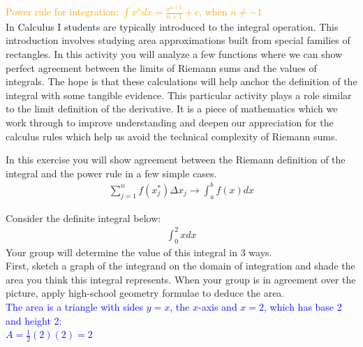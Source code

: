 \documentclass{ximera}
\begin{document}
\textcolor{orange}{Power rule for integration: $\displaystyle\int x^ndx=\frac{x^{n+1}}{n+1}+c$, when $n\neq -1$}\\



In Calculus I students are typically introduced to the integral operation. This introduction involves studying area approximations built from special families of rectangles. In this activity you will analyze a few functions where we can show perfect agreement between the limits of Riemann sums and the values of integrals. The hope is that these calculations will help anchor the definition of the integral with some tangible evidence. This particular activity plays a role similar to the limit definition of the derivative. It is a piece of mathematics which we work through to improve understanding and deepen our appreciation for the calculus rules which help us avoid the technical complexity of Riemann sums.

\begin{exercise}
In this exercise you will show agreement between the Riemann definition of the integral and the power rule in a few simple cases. 
\begin{align}
	\sum_{j=1}^n f(x^*_{j})\Delta x_{j} \rightarrow \int_{a}^b f(x) dx \nonumber
\end{align}

Consider the definite integral below:
\begin{align}
	\int_{0}^2 x dx \nonumber
\end{align}
Your group will determine the value of this integral in 3 ways.\\
First, sketch a graph of the integrand on the domain of integration and shade the area you think this integral represents. When your group is in agreement over the picture, apply high-school geometry formulae to deduce the area.\\
\textcolor{blue}{The area is a triangle with sides $y=x$, the $x$-axis and $x=2$, which has base 2 and height 2: \\
$A=\frac{1}{2}(2)(2)=2$}
\end{exercise}
\end{document}
